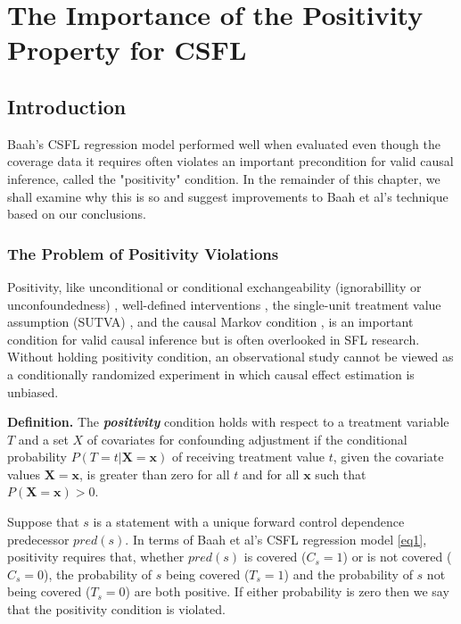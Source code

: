 \chapter{The Importance of the Positivity Property for CSFL}\label{chap:importance}

\section{Introduction}\label{sec1}

Baah's CSFL regression model performed well when evaluated \cite{baah2010causal} even though the coverage data it requires often violates an important precondition for valid causal inference, called the "positivity" condition.  In the remainder of this chapter, we shall examine why this is so and suggest improvements to Baah et al’s technique based on our conclusions.

\subsection{The Problem of Positivity Violations}\label{sec2}
Positivity, like unconditional or conditional exchangeability (ignorabillity or unconfoundedness) \cite{hernan2006estimating}, well-defined interventions \cite{Pearl2003}, the single-unit treatment value assumption (SUTVA) \cite{angrist1996identification}, and the causal Markov condition \cite{hausman1999independence}, is an important condition for valid causal inference but is often overlooked in SFL research. Without holding positivity condition, an observational study cannot be viewed as a conditionally randomized experiment in which causal effect estimation is unbiased.

{\bf Definition.}  The {\it \bf positivity} condition  holds with respect to a treatment variable $T$ and a set $X$ of covariates for confounding adjustment if the conditional probability $P(T=t|\mathbf{X=x})$ of receiving treatment value $t$, given the covariate values $\mathbf{X=x}$, is greater than zero for all $t$ and for all $\mathbf{x}$ such that $P(\mathbf{X=x})>0$.

Suppose that $s$ is a statement with a unique forward control dependence predecessor $pred(s)$.  In terms of Baah et al's CSFL regression model \eqref{eq1}, positivity requires that, whether $pred(s)$ is covered ($C_s=1$) or is not covered ($C_s=0$), the probability of $s$ being covered ($T_s=1$) and the probability of $s$ not being covered ($T_s=0$) are both positive.  If either probability is zero then we say that the positivity condition is violated.

